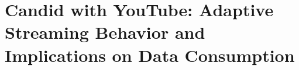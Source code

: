 \chapter[Chapter 3]
{Candid with YouTube: Adaptive Streaming Behavior and Implications on Data Consumption}
\label{chapter:youtube}
\noindent


\renewcommand{\relpath}[1]{Chapters/03.Nossdav/}
\graphicspath{{Chapters/03.Nossdav/}}












